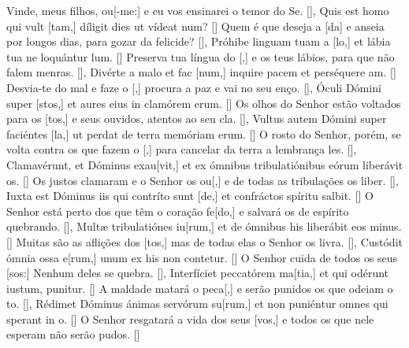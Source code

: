 {    {Vinde, meus filhos, ou[-me:] e eu vos ensinarei o temor do Se. [\LinkPT]},
  {Quis est homo qui vult [tam,] díligit dies ut vídeat \-num? [\LinkLA]}%
    {Quem é que deseja a [da] e anseia por longos dias, para gozar da felicide? [\LinkPT]},
  {Próhibe linguam tuam a [lo,] et lábia tua ne lo\-quántur \-lum. [\LinkLA]}%
    {Preserva tua língua do [,] e os teus lábios, para que não falem menras. [\LinkPT]},
  {Divérte a malo et fac [num,] inquire pacem et perséquere am. [\LinkLA]}%
    {Desvia-te do mal e faze o [,] procura a paz e vai no seu enço. [\LinkPT]},
  {Óculi Dómini super [stos,] et aures eius in clamórem erum. [\LinkLA]}%
    {Os olhos do Senhor estão voltados para os [tos,] e seus ouvidos, atentos ao seu cla. [\LinkPT]},
  {Vultus autem Dómini super faciéntes [la,] ut perdat de ter\-ra memóriam erum. [\LinkLA]}%
    {O rosto do Senhor, porém, se volta contra os que fazem o [,] para cancelar da terra a lembrança les. [\LinkPT]},
  {Clamavérunt, et Dóminus exau[vit,] et ex ómnibus tribulatiónibus eórum liberávit os. [\LinkLA]}%
    {Os justos clamaram e o Senhor os ou[,] e de todas as tribulações os liber. [\LinkPT]},
  {Iuxta est Dóminus iis qui contríto sunt [de,] et confráctos spíritu salbit. [\LinkLA]}%
    {O Senhor está perto dos que têm o coração fe[do,] e salvará os de espírito quebrando. [\LinkPT]},
  {Multæ tribulatiónes iu[rum,] et de ómnibus his liberábit eos minus. [\LinkLA]}%
    {Muitas são as aflições dos [tos,] mas de todas elas o Senhor os livra. [\LinkPT]},
  {Custódit ómnia ossa e[rum,] unum ex his non contetur. [\LinkLA]}%
    {O Senhor cuida de todos os seus [sos:] Nenhum deles se quebra. [\LinkPT]},
  {Interfíciet peccatórem ma[tia,] et qui odérunt iustum, puni\-tur. [\LinkLA]}%
    {A maldade matará o peca[,] e serão punidos os que odeiam o to. [\LinkPT]},
  {Rédimet Dóminus ánimas servórum su[rum,] et non puniéntur omnes qui sperant in o. [\LinkLA]}%
    {O Senhor resgatará a vida dos seus [vos,] e todos os que nele esperam não serão pudos. [\LinkPT]}%
}

